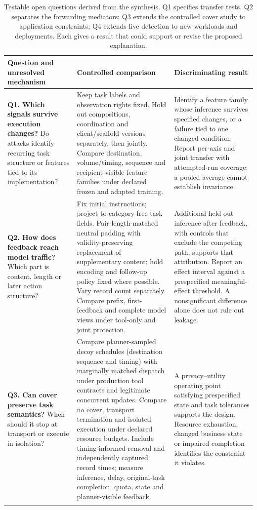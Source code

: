 \begin{table}[t]\centering\small
\caption{Testable open questions derived from the synthesis. Q1 specifies transfer tests. Q2 separates the forwarding mediators; Q3 extends the controlled cover study to application constraints; Q4 extends live detection to new workloads and deployments. Each gives a result that could support or revise the proposed explanation.}\label{tab:open-questions}
\setlength{\tabcolsep}{4pt}
\begin{tabularx}{\textwidth}{@{}P{.22\textwidth}P{.43\textwidth}Y@{}}\toprule
Question and unresolved mechanism & Controlled comparison & Discriminating result \\\midrule
\textbf{Q1. Which signals survive execution changes?} Do attacks identify recurring task structure or features tied to its implementation? & Keep task labels and observation rights fixed. Hold out compositions, coordination and client/scaffold versions separately, then jointly. Compare destination, volume/timing, sequence and recipient-visible feature families under declared frozen and adapted training. & Identify a feature family whose inference survives specified changes, or a failure tied to one changed condition. Report per-axis and joint transfer with attempted-run coverage; a pooled average cannot establish invariance. \\\addlinespace[4pt]
\textbf{Q2. How does feedback reach model traffic?} Which part is content, length or later action structure? & Fix initial instructions; project to category-free task fields. Pair length-matched neutral padding with validity-preserving replacement of supplementary content; hold encoding and follow-up policy fixed where possible. Vary record count separately. Compare prefix, first-feedback and complete model views under tool-only and joint protection. & Additional held-out inference after feedback, with controls that exclude the competing path, supports that attribution. Report an effect interval against a prespecified meaningful-effect threshold. A nonsignificant difference alone does not rule out leakage. \\\addlinespace[4pt]
\textbf{Q3. Can cover preserve task semantics?} When should it stop at transport or execute in isolation? & Compare planner-sampled decoy schedules (destination sequence and timing) with marginally matched dispatch under production tool contracts and legitimate concurrent updates. Compare no cover, transport termination and isolated execution under declared resource budgets. Include timing-informed removal and independently captured record times; measure inference, delay, original-task completion, quota, state and planner-visible feedback. & A privacy--utility operating point satisfying prespecified state and task tolerances supports the design. Resource exhaustion, changed business state or impaired completion identifies the constraint it violates. \\\addlinespace[4pt]

\end{tabularx}
\end{table}
